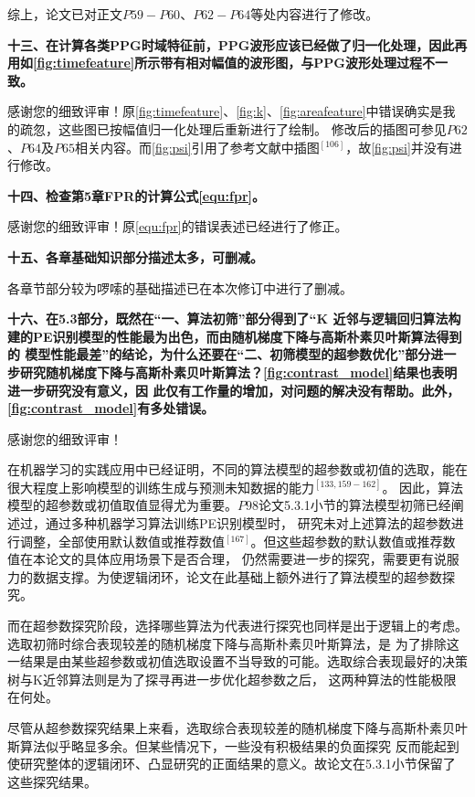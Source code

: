 综上，论文已对正文$P59-P60$、$P62-P64$等处内容进行了修改。

\textbf{十三、在计算各类PPG时域特征前，PPG波形应该已经做了归一化处理，因此再用如\autoref{fig:timefeature}所示带有相对幅值的波形图，与PPG波形处理过程不一致。}

感谢您的细致评审！原\autoref{fig:timefeature}、\autoref{fig:k}、\autoref{fig:areafeature}中错误确实是我的疏忽，这些图已按幅值归一化处理后重新进行了绘制。
修改后的插图可参见$P62$、$P64$及$P65$相关内容。而\autoref{fig:psi}引用了参考文献中插图$^{[106]}$，故\autoref{fig:psi}并没有进行修改。

\textbf{十四、检查第5章FPR的计算公式\autoref{equ:fpr}。}

感谢您的细致评审！原\autoref{equ:fpr}的错误表述已经进行了修正。

\textbf{十五、各章基础知识部分描述太多，可删减。}

各章节部分较为啰嗦的基础描述已在本次修订中进行了删减。

\textbf{十六、在5.3部分，既然在“一、算法初筛”部分得到了“K 近邻与逻辑回归算法构建的PE识别模型的性能最为出色，而由随机梯度下降与高斯朴素贝叶斯算法得到的
模型性能最差”的结论，为什么还要在“二、初筛模型的超参数优化”部分进一步研究随机梯度下降与高斯朴素贝叶斯算法？\autoref{fig:contrast_model}结果也表明进一步研究没有意义，因
此仅有工作量的增加，对问题的解决没有帮助。此外，\autoref{fig:contrast_model}有多处错误。}

感谢您的细致评审！

在机器学习的实践应用中已经证明，不同的算法模型的超参数或初值的选取，能在很大程度上影响模型的训练生成与预测未知数据的能力$^{[133,159-162]}$。
因此，算法模型的超参数或初值取值显得尤为重要。$P98$论文5.3.1小节的算法模型初筛已经阐述过，通过多种机器学习算法训练PE识别模型时，
研究未对上述算法的超参数进行调整，全部使用默认数值或推荐数值$^{[167]}$。但这些超参数的默认数值或推荐数值在本论文的具体应用场景下是否合理，
仍然需要进一步的探究，需要更有说服力的数据支撑。为使逻辑闭环，论文在此基础上额外进行了算法模型的超参数探究。

而在超参数探究阶段，选择哪些算法为代表进行探究也同样是出于逻辑上的考虑。选取初筛时综合表现较差的随机梯度下降与高斯朴素贝叶斯算法，是
为了排除这一结果是由某些超参数或初值选取设置不当导致的可能。选取综合表现最好的决策树与K近邻算法则是为了探寻再进一步优化超参数之后，
这两种算法的性能极限在何处。

尽管从超参数探究结果上来看，选取综合表现较差的随机梯度下降与高斯朴素贝叶斯算法似乎略显多余。但某些情况下，一些没有积极结果的负面探究
反而能起到使研究整体的逻辑闭环、凸显研究的正面结果的意义。故论文在5.3.1小节保留了这些探究结果。

